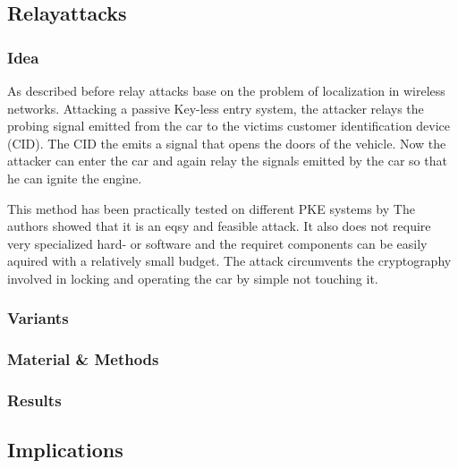 
\subsection{Relayattacks}
\subsubsection*{Idea}
	As described before relay attacks base on the problem of localization in
	wireless networks.
	Attacking a passive Key-less entry system,
	the attacker relays the probing signal emitted from the car to the victims
	customer identification device (CID).
	The CID the emits a signal that opens the doors of the vehicle.
	Now the attacker can enter the car and again relay the signals emitted by the
	car so that he can ignite the engine.
	
	This method has been practically tested on different PKE systems by %
	The authors showed that it is an eqsy and feasible attack.
	It also does not require very specialized hard- or software and
	the requiret components can be easily aquired with a relatively small budget.
	The attack circumvents the cryptography involved in locking and
	operating the car by simple not touching it.

\subsubsection*{Variants}
\subsubsection*{Material \& Methods}

\subsubsection*{Results}

\subsection*{Implications}
